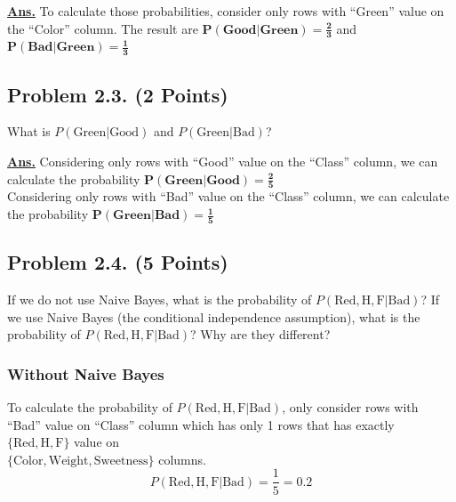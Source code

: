\documentclass[12pt, a4paper]{article}
\begin{document}
            \vspace{1em}

            \noindent \underline{\textbf{Ans.}} To calculate those probabilities, consider only rows with \enquote{Green} value on the \enquote{Color} column.
            The result are $\mathbf{P(\textbf{Good} | \textbf{Green}) = \frac{2}{3}}$ and $\mathbf{P(\textbf{Bad} | \textbf{Green}) = \frac{1}{3}}$

        \subsection{Problem 2.3. (2 Points)}
            What is $P(\text{Green} | \text{Good})$ and $P(\text{Green}| \text{Bad})$?

            \vspace{1em}

            \noindent \underline{\textbf{Ans.}} Considering only rows with \enquote{Good} value on the \enquote{Class} column, we can calculate the
            probability $\mathbf{P(\textbf{Green} | \textbf{Good}) = \frac{2}{5}}$ \\[0.5em]
            Considering only rows with \enquote{Bad} value on the \enquote{Class} column, we can calculate the probability $\mathbf{P(\textbf{Green} | \textbf{Bad}) = \frac{1}{5}}$

    \pagebreak

        \subsection{Problem 2.4. (5 Points)}
            If we do not use Naive Bayes, what is the probability of $P(\text{Red}, \text{H}, \text{F} | \text{Bad})$?
            If we use Naive Bayes (the conditional independence assumption), what is the probability of $P(\text{Red}, \text{H}, \text{F} | \text{Bad})$?
            Why are they different?

            \subsubsection{Without Naive Bayes}
                To calculate the probability of $P(\text{Red}, \text{H}, \text{F} | \text{Bad})$, only consider rows with \enquote{Bad} value on \enquote{Class} column
                which has only 1 rows that has exactly $\{ \text{Red}, \text{H}, \text{F} \}$ value on  \\ $\{ \text{Color}, \text{Weight}, \text{Sweetness} \}$ columns.
                $$P(\text{Red}, \text{H}, \text{F} | \text{Bad}) = \frac{1}{5} = 0.2$$
\end{document}
